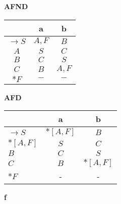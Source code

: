 \documentclass[ ]{article}
\begin{document}
\begin{center}
    \begin{minipage}[t]{0.48\textwidth} %
        \centering %
        \textbf{AFND}\\ %
        \vspace{0.2cm} %
        \begin{tabular}{|c|c|c|} %
            \toprule %
            & a & b \\
            \midrule %
		$\to S$ & $A,F$ & $B$\\
		$A$ & $S$ & $C$\\
		$B$ & $C$ & $S$\\
		$C$ & $B$ & $A,F$\\
		$*F$ & $-$ & $-$\\
            \bottomrule %
        \end{tabular}
    \end{minipage}%
    \hfill %
    \begin{minipage}[t]{0.48\textwidth} %
        \centering %
        \textbf{AFD}\\ %
        \vspace{0.2cm} %
        \begin{tabular}{|l|c|c|} %
            \toprule %
            & a & b \\
            \midrule %
		$\to S$ & $*[A,F]$ & $B$\\
		$*[A,F]$ & $S$ & $C$\\
		$B$ & $C$ & $S$\\
		$C$ & $B$ & $*[A,F]$\\
		$*F$ & - & -\\
            \bottomrule %
        \end{tabular}
    \end{minipage}
\end{center}
		\textbf{f}
		
\end{document}
